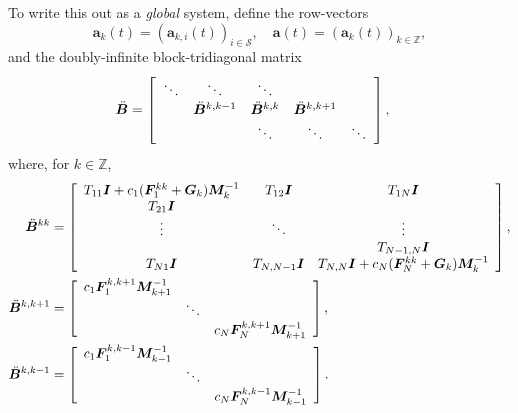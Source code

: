 

To write this out as a \textit{global} system, define the row-vectors 
\[\boldsymbol a_k(t) = (\boldsymbol a_{k,i}(t))_{i\in\mathcal S},\quad \boldsymbol a(t) = (\boldsymbol a_k(t))_{k\in\mathbb Z},\]
and the doubly-infinite block-tridiagonal matrix 
\begin{align*}
\ddot{\boldsymbol B} &= \left[\begin{array}{ccccc}
	\ddots & \ddots & \ddots & & \\
	& \ddot{\boldsymbol B}^{k,k-1} & \ddot{\boldsymbol B}^{k,k} & \ddot{\boldsymbol B}^{k,k+1} & \\
	& & \ddots & \ddots & \ddots 
\end{array}\right],
\end{align*}
where, for \(k\in\mathbb Z\), 
\begin{align*}
    \ddot{{\boldsymbol B}}^{kk}&=\left[\begin{array}{ccc}T_{11}\boldsymbol I + c_1(\boldsymbol F_1^{kk}+\boldsymbol G_k)\boldsymbol M_k^{-1} & T_{12}\boldsymbol I & T_{1N}\boldsymbol I  \\ T_{21}\boldsymbol I & & \\ \vdots &\ddots & \vdots \\ & &   T_{N-1,N}\boldsymbol I \\  T_{N1}\boldsymbol I &  T_{N,N-1}\boldsymbol I & T_{N,N}\boldsymbol I +c_{N}(\boldsymbol F_{N}^{kk}+\boldsymbol G_k)\boldsymbol M_k^{-1}\end{array}\right],\\
	\ddot{{\boldsymbol B}}^{k,k+1}&=\left[\begin{array}{ccc}c_1\boldsymbol F_1^{k,k+1}\boldsymbol M_{k+1}^{-1}&  & \\  &\ddots & \\  &  &c_{N}\boldsymbol F_{N}^{k,k+1}\boldsymbol M_{k+1}^{-1} \end{array}\right],\\
	\ddot{{\boldsymbol B}}^{k,k-1}&=\left[\begin{array}{ccc}c_1\boldsymbol F_1^{k,k-1}\boldsymbol M_{k-1}^{-1}&  & \\  &\ddots &  \\  &  &c_{N}\boldsymbol F_{N}^{k,k-1}\boldsymbol M_{k-1}^{-1} \end{array}\right].
\end{align*} 
